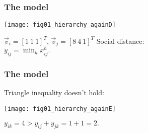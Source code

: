  
% 


\begin{frame}
  \frametitle{The model}

  \begin{center}
    \texttt{[image: fig01\_hierarchy\_againD]}
  \end{center}

  \begin{center}

    $\vec{v}_i = [ 1 \  1 \ 1 ]^T$, $\vec{v}_j = [ 8 \ 4 \ 1]^T$ \hfill
    Social distance:\\
    \hfill
    $ \boxed{y_{ij} = \min_h x^h_{ij}.} $

  \end{center}

\end{frame}

% 
% 
% 
% 
%     
% 
% 
% 


\begin{frame}
  \frametitle{The model}

  Triangle inequality doesn't hold:

  \begin{center}
    \texttt{[image: fig01\_hierarchy\_againE]}
  \end{center}

  \begin{center}
    \alert{$y_{ik} = 4 > y_{ij} + y_{jk} = 1 + 1 = 2.$}
  \end{center}
 \end{frame}


